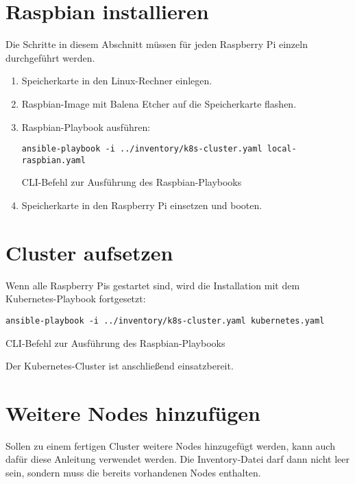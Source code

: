 \section{Raspbian installieren}
Die Schritte in diesem Abschnitt müssen für jeden Raspberry Pi einzeln durchgeführt werden.

\begin{enumerate}
    \item Speicherkarte in den Linux-Rechner einlegen.
    \item Raspbian-Image mit Balena Etcher auf die Speicherkarte flashen.
    \item Raspbian-Playbook ausführen:
        \begin{lstlisting}
ansible-playbook -i ../inventory/k8s-cluster.yaml local-raspbian.yaml
        \end{lstlisting}
        \caption{CLI-Befehl zur Ausführung des Raspbian-Playbooks}
    \item Speicherkarte in den Raspberry Pi einsetzen und booten.
\end{enumerate}

\section{Cluster aufsetzen}

Wenn alle Raspberry Pis gestartet sind, wird die Installation mit dem Kubernetes-Playbook fortgesetzt:
\begin{lstlisting}
ansible-playbook -i ../inventory/k8s-cluster.yaml kubernetes.yaml
\end{lstlisting}
\caption{CLI-Befehl zur Ausführung des Raspbian-Playbooks}

Der Kubernetes-Cluster ist anschließend einsatzbereit.

\section{Weitere Nodes hinzufügen}

Sollen zu einem fertigen Cluster weitere Nodes hinzugefügt werden, kann auch dafür diese Anleitung verwendet werden.
Die Inventory-Datei darf dann nicht leer sein, sondern muss die bereits vorhandenen Nodes enthalten.
